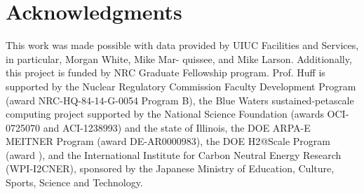 \section{Acknowledgments}

This work was made possible with data provided by UIUC
Facilities and Services, in particular, Morgan White, Mike Mar-
quissee, and Mike Larson. Additionally, this project is funded by NRC Graduate
Fellowship program.
Prof. Huff is supported by the Nuclear Regulatory Commission Faculty
Development Program (award NRC-HQ-84-14-G-0054 Program B), the Blue Waters
sustained-petascale computing project supported by the National Science
Foundation (awards OCI-0725070 and ACI-1238993) and the state of Illinois,
the DOE ARPA-E MEITNER Program (award DE-AR0000983), the DOE H2@Scale
Program (award ), and the International Institute for Carbon Neutral Energy
Research (WPI-I2CNER), sponsored by the Japanese Ministry of Education,
Culture, Sports, Science and Technology.
